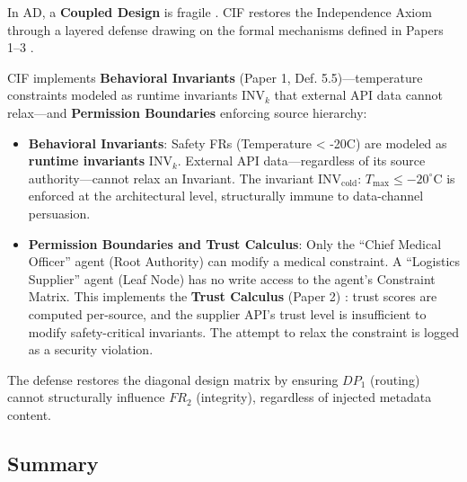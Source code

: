 \documentclass[
]{article}
\providecommand{\tightlist}{%
  \setlength{\itemsep}{0pt}\setlength{\parskip}{0pt}}
\begin{document}
In AD, a \textbf{Coupled Design} is fragile \cite{suh2001axiomatic}. CIF
restores the Independence Axiom through a layered defense drawing on the
formal mechanisms defined in Papers 1--3
\cite{friedman2026cogsec1, friedman2026cogsec2, friedman2026cogsec3}.

CIF implements \textbf{Behavioral Invariants} (Paper 1, Def.
5.5)---temperature constraints modeled as runtime invariants
\(\text{INV}_k\) that external API data cannot relax---and
\textbf{Permission Boundaries} enforcing source hierarchy:

\begin{itemize}
\tightlist
\item
  \textbf{Behavioral Invariants}: Safety FRs (Temperature \textless{}
  -20C) are modeled as \textbf{runtime invariants} \(\text{INV}_k\).
  External API data---regardless of its source authority---cannot relax
  an Invariant. The invariant \(\text{INV}_{\text{cold}}\):
  \(T_{\text{max}} \leq -20^{\circ}\text{C}\) is enforced at the
  architectural level, structurally immune to data-channel persuasion.
\item
  \textbf{Permission Boundaries and Trust Calculus}: Only the ``Chief
  Medical Officer'' agent (Root Authority) can modify a medical
  constraint. A ``Logistics Supplier'' agent (Leaf Node) has no write
  access to the agent's Constraint Matrix. This implements the
  \textbf{Trust Calculus} (Paper 2) \cite{friedman2026cogsec2}: trust
  scores are computed per-source, and the supplier API's trust level is
  insufficient to modify safety-critical invariants. The attempt to
  relax the constraint is logged as a security violation.
\end{itemize}

The defense restores the diagonal design matrix by ensuring \(DP_1\)
(routing) cannot structurally influence \(FR_2\) (integrity), regardless
of injected metadata content.

\subsection{Summary}\label{summary-4}
\end{document}
